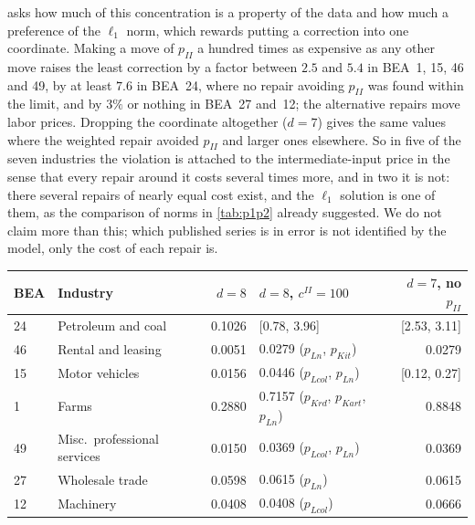  asks how much of this concentration is a property of the data and how much a preference of the $\ell_1$ norm, which rewards putting a correction into one coordinate. Making a move of $p_{II}$ a hundred times as expensive as any other move raises the least correction by a factor between $2.5$ and $5.4$ in BEA~1, 15, 46 and 49, by at least $7.6$ in BEA~24, where no repair avoiding $p_{II}$ was found within the limit, and by $3\%$ or nothing in BEA~27 and~12; the alternative repairs move labor prices. Dropping the coordinate altogether ($d=7$) gives the same values where the weighted repair avoided $p_{II}$ and larger ones elsewhere. So in five of the seven industries the violation is attached to the intermediate-input price in the sense that every repair around it costs several times more, and in two it is not: there several repairs of nearly equal cost exist, and the $\ell_1$ solution is one of them, as the comparison of norms in \cref{tab:p1p2} already suggested. We do not claim more than this; which published series is in error is not identified by the model, only the cost of each repair is.

\begin{table}[t]
{\small\begin{tabular}{llrlr}
\toprule
BEA & Industry & $d=8$ & $d=8$, $c^{II}=100$ & $d=7$, no $p_{II}$ \\
\midrule
24 & Petroleum and coal & 0.1026 & [0.78, 3.96] & [2.53, 3.11] \\
46 & Rental and leasing & 0.0051 & 0.0279 ($p_{Ln}$, $p_{Kit}$) & 0.0279 \\
15 & Motor vehicles & 0.0156 & 0.0446 ($p_{Lcol}$, $p_{Ln}$) & [0.12, 0.27] \\
1 & Farms & 0.2880 & 0.7157 ($p_{Krd}$, $p_{Kart}$, $p_{Ln}$) & 0.8848 \\
49 & Misc.\ professional services & 0.0150 & 0.0369 ($p_{Lcol}$, $p_{Ln}$) & 0.0369 \\
27 & Wholesale trade & 0.0598 & 0.0615 ($p_{Ln}$) & 0.0615 \\
12 & Machinery & 0.0408 & 0.0408 ($p_{Lcol}$) & 0.0666 \\
\bottomrule
\end{tabular}}
{}
\end{table}

